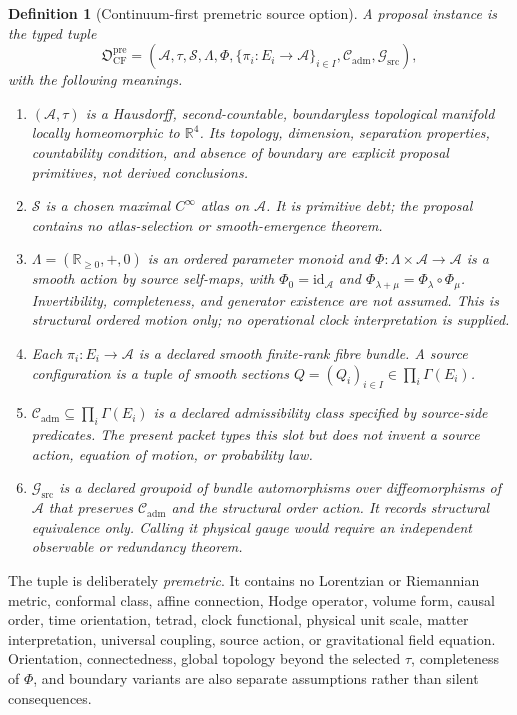 \documentclass[11pt]{article}
\newtheorem{definition}{Definition}
\newcommand{\A}{\mathcal A}
\newcommand{\C}{\mathcal C}
\newcommand{\G}{\mathcal G}
\begin{document}
\begin{definition}[Continuum-first premetric source option]
A proposal instance is the typed tuple
\[
  \mathfrak O_{\mathrm{CF}}^{\mathrm{pre}}
  = (\A,\tau,\mathcal S,\Lambda,\Phi,
      \{\pi_i:E_i\!\to\!\A\}_{i\in I},\C_{\mathrm{adm}},\G_{\mathrm{src}}),
\]
with the following meanings.
\begin{enumerate}[label=(\roman*)]
  \item $(\A,\tau)$ is a Hausdorff, second-countable, boundaryless
  topological manifold locally homeomorphic to $\mathbb R^4$. Its topology,
  dimension, separation properties, countability condition, and absence of
  boundary are explicit proposal primitives, not derived conclusions.
  \item $\mathcal S$ is a chosen maximal $C^\infty$ atlas on $\A$. It is
  primitive debt; the proposal contains no atlas-selection or smooth-emergence
  theorem.
  \item $\Lambda=(\mathbb R_{\ge 0},+,0)$ is an ordered parameter monoid and
  $\Phi:\Lambda\times\A\to\A$ is a smooth action by source self-maps, with
  $\Phi_0=\mathrm{id}_{\A}$ and
  $\Phi_{\lambda+\mu}=\Phi_\lambda\circ\Phi_\mu$. Invertibility, completeness,
  and generator existence are not assumed. This is structural
  ordered motion only; no operational clock interpretation is supplied.
  \item Each $\pi_i:E_i\to\A$ is a declared smooth finite-rank fibre bundle.
  A source configuration is a tuple of smooth sections
  $Q=(Q_i)_{i\in I}\in\prod_i\Gamma(E_i)$.
  \item $\C_{\mathrm{adm}}\subseteq\prod_i\Gamma(E_i)$ is a declared
  admissibility class specified by source-side predicates. The present packet
  types this slot but does not invent a source action, equation of motion, or
  probability law.
  \item $\G_{\mathrm{src}}$ is a declared groupoid of bundle automorphisms
  over diffeomorphisms of $\A$ that preserves $\C_{\mathrm{adm}}$ and the
  structural order action. It records structural equivalence only. Calling it
  physical gauge would require an independent observable or redundancy theorem.
\end{enumerate}
\end{definition}

The tuple is deliberately \emph{premetric}. It contains no Lorentzian or
Riemannian metric, conformal class, affine connection, Hodge operator, volume
form, causal order, time orientation, tetrad, clock functional, physical unit
scale, matter interpretation, universal coupling, source action, or
gravitational field equation. Orientation, connectedness, global topology
beyond the selected $\tau$, completeness of $\Phi$, and boundary variants are
also separate assumptions rather than silent consequences.
\end{document}
